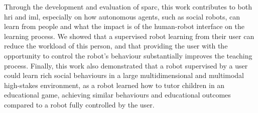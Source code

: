 Through the development and evaluation of \gls{sparc}, this work contributes to both \gls{hri} and \acrlong{iml}, especially on how autonomous agents, such as social robots, can learn from people and what the impact is of the human-robot interface on the learning process. We showed that a supervised robot learning from their user can reduce the workload of this person, and that providing the user with the opportunity to control the robot's behaviour substantially improves the teaching process. Finally, this work also demonstrated that a robot supervised by a user could learn rich social behaviours in a large multidimensional and multimodal high-stakes environment, as a robot learned how to tutor children in an educational game, achieving similar behaviours and educational outcomes compared to a robot fully controlled by the user. 

